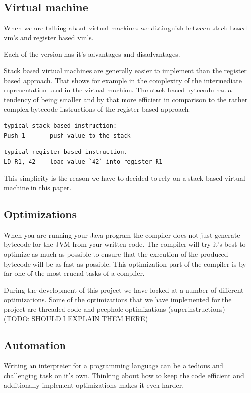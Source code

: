 \documentclass{article}
\begin{document}
\subsection{Virtual machine}
When we are talking about virtual machines we distinguish between stack based vm's and 
register based vm's.

Each of the version has it's advantages and disadvantages.

Stack based virtual machines are generally easier to implement than the register based approach.
That shows for example in the complexity of the intermediate representation used in the virtual 
machine. The stack based bytecode has a tendency of being smaller and by that more efficient in 
comparison to the rather complex bytecode instructions of the register based approach.

\begin{verbatim}
typical stack based instruction:
Push 1    -- push value to the stack
\end{verbatim}

\begin{verbatim}
typical register based instruction:
LD R1, 42 -- load value `42` into register R1
\end{verbatim}

This simplicity is the reason we have to decided to rely on a stack based virtual machine in
this paper.

\subsection{Optimizations}
When you are running your Java program the compiler does not just generate bytecode for
the JVM from your written code. The compiler will try it's best to optimize as much as possible
to ensure that the execution of the produced bytecode will be as fast as possible.
This optimization part of the compiler is by far one of the most crucial tasks of a compiler.

During the development of this project we have looked at a number of different
optimizations. Some of the optimizations that we have implemented for the
project are threaded code and peephole optimizations (superinstructions) (TODO:
SHOULD I EXPLAIN THEM HERE)


\subsection{Automation}
Writing an interpreter for a programming language can be a tedious and
challenging task on it's own. Thinking about how to keep the code efficient and
additionally implement optimizations makes it even harder.
\end{document}
